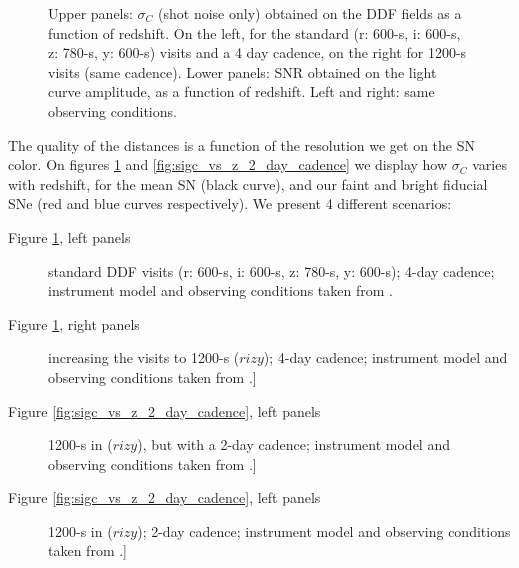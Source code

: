 \documentclass[\docopts]{\docclass}
\begin{document}
\begin{figure}
\begin{center}
\end{center}
\caption{Upper panels: $\sigma_C$ (shot noise only) obtained on the
  DDF fields as a function of redshift.  On the left, for the standard
  (r: 600-s, i: 600-s, z: 780-s, y: 600-s) visits and a 4 day cadence,
  on the right for 1200-s visits (same cadence). Lower panels: SNR
  obtained on the light curve amplitude, as a function of
  redshift. Left and right: same observing conditions.}
\label{fig:sigc_vs_z_4_day_cadence}
\end{figure}

The quality of the distances is a function of the resolution we get on
the SN color.  On figures \ref{fig:sigc_vs_z_4_day_cadence} and
\ref{fig:sigc_vs_z_2_day_cadence} we display how $\sigma_C$ varies
with redshift, for the mean SN (black curve), and our faint and bright
fiducial SNe (red and blue curves respectively).  We present 4
different scenarios:
\begin{description}
\item[Figure \ref{fig:sigc_vs_z_4_day_cadence}, left panels] standard
  DDF visits (r: 600-s, i: 600-s, z: 780-s, y: 600-s); 4-day cadence;
  instrument model and observing conditions taken from
  .
\item[Figure \ref{fig:sigc_vs_z_4_day_cadence}, right panels]
  increasing the visits to 1200-s ($rizy$); 4-day cadence; instrument
  model and observing conditions taken from .]
\item[Figure \ref{fig:sigc_vs_z_2_day_cadence}, left panels] 1200-s in
  ($rizy$), but with a 2-day cadence; instrument model and observing
  conditions taken from .]
\item[Figure \ref{fig:sigc_vs_z_2_day_cadence}, left panels] 1200-s in
  ($rizy$); 2-day cadence; instrument model and observing conditions
  taken from .]
\end{description}
\end{document}
